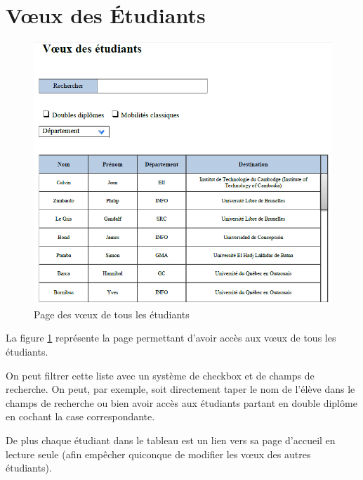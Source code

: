\section{Vœux des Étudiants}
\label{sec::stud_wish}


\begin{figure}[H]
	\includegraphics[scale=0.8]{Etudiant/Voeux.PNG}
	\caption{Page des vœux de tous les étudiants}
	\label{fig::list_wish}
\end{figure}


La figure \ref{fig::list_wish} représente la page permettant d'avoir accès aux vœux de tous les étudiants.

On peut filtrer cette liste avec un système de checkbox et de champs de recherche. On peut, par exemple, soit directement taper le nom de l'élève dans le champs de recherche ou bien avoir accès aux étudiants partant en double diplôme en cochant la case correspondante.

De plus chaque étudiant dans le tableau est un lien vers sa page d'accueil en lecture seule (afin empêcher quiconque de modifier les vœux des autres étudiants).

